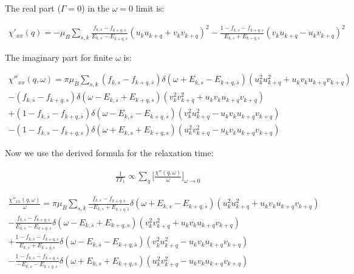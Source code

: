 \documentclass{article}
\begin{document}
The real part ($\Gamma = 0$) in the $\omega = 0$ limit is:

\begin{align*}
\chi'_{xx}(q) = -\mu_{B} \sum\limits_{s,k} \frac{f_{k,s}-f_{k+q,\bar{s}}}{E_{k,s} - E_{k+q,\bar{s}} }(u_k u_{k+q} + v_k v_{k+q})^2 
				 -  \frac{1-f_{k,s}-f_{k+q,s}}{E_{k,s} + E_{k+q,s}}(v_k u_{k+q} - u_k v_{k+q})^2
\end{align*}

The imaginary part for finite $\omega$ is:

\begin{align*}
\chi ''_{xx}(q,\omega) = \pi \mu_{B} \sum\limits_{s,k} (f_{k,s}-f_{k+q,\bar{s}})\delta(\omega + E_{k,s} - E_{k+q,\bar{s}})(u_k^2 u_{k+q}^2 + u_k v_k u_{k+q} v_{k+q}) \\
				  - (f_{k,\bar{s}}-f_{k+q,s})\delta(\omega - E_{k,\bar{s}} + E_{k+q,s} )(v_k^2 v_{k+q}^2 + u_k v_k u_{k+q} v_{k+q}) \\
				 +  (1-f_{k,\bar{s}}-f_{k+q,\bar{s}})\delta(\omega - E_{k,\bar{s}} - E_{k+q,\bar{s}})(v_k^2 u_{k+q}^2 - u_k v_k u_{k+q} v_{k+q}) \\
				 -(1-f_{k,s}-f_{k+q,s})\delta(\omega + E_{k,s} + E_{k+q,s})(u_k^2 v_{k+q}^2 - u_k v_k u_{k+q} v_{k+q})
\end{align*}

Now we use the derived formula for the relaxation time:

\begin{align*}
\frac{1}{TT_1} \propto \sum\limits_q \bigg[ \frac{\chi '' (q,\omega)}{\omega}\bigg]_{\omega \rightarrow 0}
\end{align*}

\begin{align*}
\frac{\chi ''_{xx}(q,\omega)}{\omega} = \pi \mu_{B} \sum\limits_{s,k} \frac{f_{k,s}-f_{k+q,\bar{s}}}{-E_{k,s} + E_{k+q,\bar{s}}}\delta(\omega + E_{k,s} - E_{k+q,\bar{s}})(u_k^2 u_{k+q}^2 + u_k v_k u_{k+q} v_{k+q}) \\
				  - \frac{f_{k,\bar{s}}-f_{k+q,s}}{E_{k,\bar{s}} - E_{k+q,s}}\delta(\omega - E_{k,\bar{s}} + E_{k+q,s} )(v_k^2 v_{k+q}^2 + u_k v_k u_{k+q} v_{k+q}) \\
				 +  \frac{1-f_{k,\bar{s}}-f_{k+q,\bar{s}}}{E_{k,\bar{s}} + E_{k+q,\bar{s}}}\delta(\omega - E_{k,\bar{s}} - E_{k+q,\bar{s}})(v_k^2 u_{k+q}^2 - u_k v_k u_{k+q} v_{k+q}) \\
				 -\frac{1-f_{k,s}-f_{k+q,s}}{-E_{k,s} - E_{k+q,s}}\delta(\omega + E_{k,s} + E_{k+q,s})(u_k^2 v_{k+q}^2 - u_k v_k u_{k+q} v_{k+q})
\end{align*}
\end{document}
